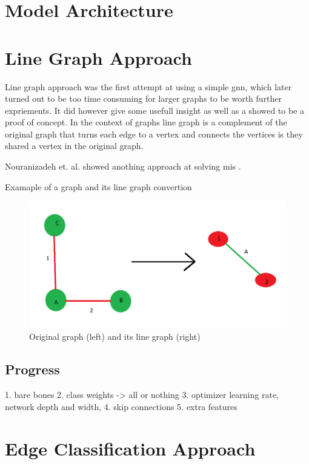\section{Model Architecture}



\section{Line Graph Approach}

Line graph approach was the first attempt at using a simple \gls{gnn}, which later turned out to be too time consuming for larger graphs to be worth further expriements. It did however give some usefull insight as well as a showed to be a proof of concept. In the context of graphs line graph is a complement of the original graph that turns each edge to a vertex and connects the vertices is they shared a vertex in the original graph. 

Nouranizadeh et. al. showed anothing approach at solving \gls{mis} \cite{DBLPjournals/corr/abs-2107-01410}.

Examaple of a graph and its line graph convertion
\begin{figure}[H]
    \centering
    \includegraphics[scale=0.5]{figures/LineGraphExample}
    \caption{Original graph (left) and its line graph (right)}
    \label{Line graph figure}
\end{figure}

\subsection{Progress}

1. bare bones
2. class weights -> all or nothing
3. optimizer learning rate, network depth and width, 
4. skip connections
5. extra features


\section{Edge Classification Approach}

